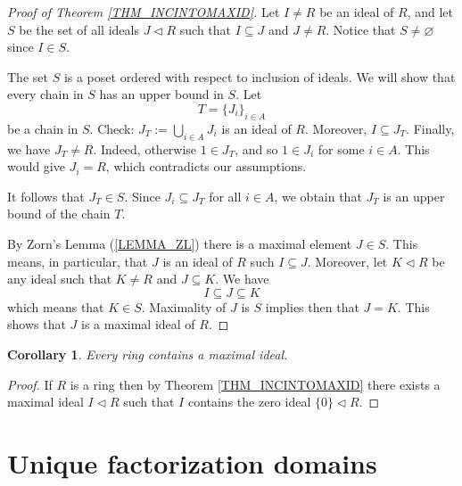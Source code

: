 \documentclass[12pt, letterpaper, oneside]{article}
\theoremstyle{plain}
\newtheorem{corollary}[theorem]{Corollary}
\theoremstyle{definition}
\newcommand{\vs}{\vskip 5mm}
\begin{document}
\begin{proof}[Proof of Theorem \ref{THM_INCINTOMAXID}]
Let $I\neq R$ be an ideal of $R$, and let $S$ be the set of all ideals $J\lhd R$ such that 
$I \subseteq J$ and $J \neq R$. Notice that $S\neq\varnothing$ since $I\in S$.

The set $S$ is a poset ordered with respect to  inclusion of ideals. 
We will show that every chain in $S$ has an upper bound in $S$. Let 
$$T= \{J_{i}\}_{i\in A}$$ 
be a chain in $S$. Check: $J_{T} := \bigcup_{i\in A}J_{i}$ is an ideal of  $R$. Moreover, 
$I\subseteq J_{T}$. Finally, we have  $J_{T} \neq R$. Indeed, otherwise $1\in J_{T}$, and so 
$1\in J_{i}$ for some $i\in A$. This would give $J_{i} = R$, which contradicts our assumptions.
 
 It follows that $J_{T}\in S$. Since $J_{i}\subseteq J_{T}$ for all $i\in A$, we obtain that 
 $J_{T}$ is an upper bound of the chain $T$.
 
 By Zorn's Lemma (\ref{LEMMA_ZL}) there is a maximal element $J\in S$. This means, in particular, 
that  $J$ is an ideal of $R$ such $I\subseteq J$. Moreover, let $K\lhd R$ be any ideal such that  
 $K\neq R$ and $J\subseteq K$. We have 
 $$I\subseteq  J \subseteq K$$ 
 which means that $K\in S$. Maximality of $J$ is $S$ implies then that $J = K$. 
 This shows that $J$ is a maximal ideal of $R$. 
  
\end{proof}

\vs\vs

\begin{corollary}
Every ring contains a maximal ideal.
\end{corollary}

\vs

\begin{proof}
If $R$ is a ring then by Theorem \ref{THM_INCINTOMAXID}
there exists a maximal ideal $I\lhd R$ such that $I$ contains the zero ideal $\{0\}\lhd R$.
\end{proof}








\newpage
\section{Unique factorization domains}
\label{SEC_UFD}
\end{document}
